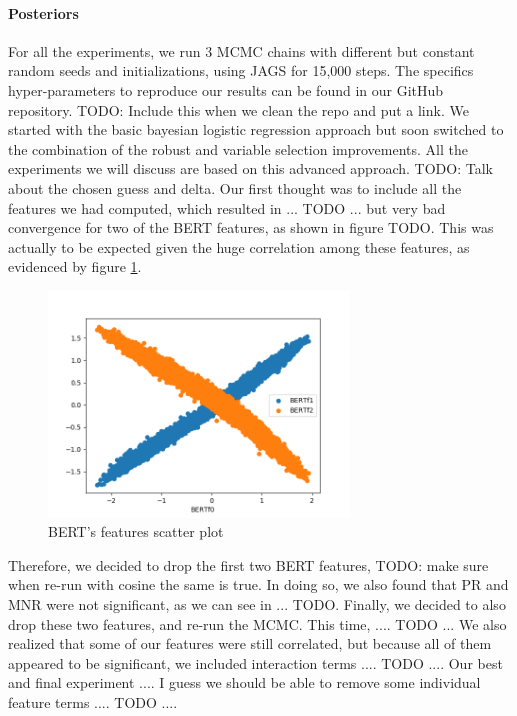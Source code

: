 \documentclass[man, floatsintext, 10pt]{apa6}
\begin{document}
\vspace{2mm}

\paragraph{Posteriors} For all the experiments, we run 3 MCMC chains with different but constant random seeds and initializations, using JAGS for 15,000 steps. The specifics hyper-parameters to reproduce our results can be found in our GitHub repository. TODO: Include this when we clean the repo and put a link. We started with the basic bayesian logistic regression approach but soon switched to the combination of the robust and variable selection improvements. All the experiments we will discuss are based on this advanced approach. TODO: Talk about the chosen guess and delta. Our first thought was to include all the features we had computed, which resulted in ... TODO ... but very bad convergence for two of the BERT features, as shown in figure TODO. This was actually to be expected given the huge correlation among these features, as evidenced by figure \ref{BERTf}.

\begin{figure}
\includegraphics[width=8cm]{BERTFeaturesScatterPlot.png}
\caption{BERT's features scatter plot}
  \label{BERTf}
\end{figure}

Therefore, we decided to drop the first two BERT features, TODO: make sure when re-run with cosine the same is true. In doing so, we also found that PR and MNR were not significant, as we can see in ... TODO. Finally, we decided to also drop these two features, and re-run the MCMC. This time, .... TODO ...   We also realized that some of our features were still correlated, but because all of them appeared to be significant, we included interaction terms .... TODO .... Our best and final experiment .... I guess we should be able to remove some individual feature terms .... TODO ....
\end{document}
